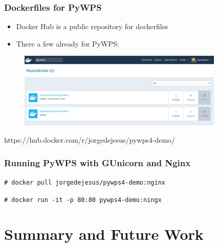 \documentclass{beamer}
\begin{document}
\begin{frame}
\frametitle<presentation>{Dockerfiles for PyWPS}

\begin{itemize}
  \item Docker Hub is a public repository for dockerfiles
  \item There a few already for PyWPS:   
\end{itemize}

  \begin{figure}[ht]
   \centering
   \includegraphics[height=3.6cm]{figures/DockerfilesPyWPS}
  \end{figure}
  
\vspace{0.2cm}
\centering
\footnotesize{https://hub.docker.com/r/jorgedejesus/pywps4-demo/}

\end{frame}

\begin{frame}
\frametitle<presentation>{Running PyWPS with GUnicorn and Nginx}

\texttt{\# docker pull jorgedejesus/pywps4-demo:nginx}

\texttt{\# docker run -it -p 80:80 pywps4-demo:ningx}

\end{frame}


\section{Summary and Future Work}
\end{document}
